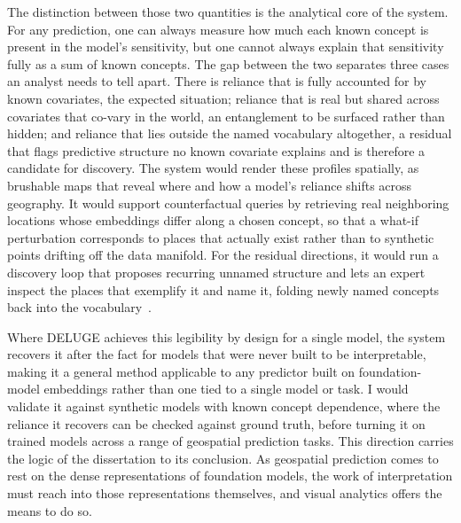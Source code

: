 The distinction between those two quantities is the analytical core of the system.
%
For any prediction, one can always measure how much each known concept is present in the model's sensitivity, but one cannot always explain that sensitivity fully as a sum of known concepts.
%
The gap between the two separates three cases an analyst needs to tell apart. There is reliance that is fully accounted for by known covariates, the expected situation; reliance that is real but shared across covariates that co-vary in the world, an entanglement to be surfaced rather than hidden; and reliance that lies outside the named vocabulary altogether, a residual that flags predictive structure no known covariate explains and is therefore a candidate for discovery.
%
The system would render these profiles spatially, as brushable maps that reveal where and how a model's reliance shifts across geography.
%
It would support counterfactual queries by retrieving real neighboring locations whose embeddings differ along a chosen concept, so that a what-if perturbation corresponds to places that actually exist rather than to synthetic points drifting off the data manifold.
%
For the residual directions, it would run a discovery loop that proposes recurring unnamed structure and lets an expert inspect the places that exemplify it and name it, folding newly named concepts back into the vocabulary~\cite{ghorbani2019ace}.

Where DELUGE achieves this legibility by design for a single model, the system recovers it after the fact for models that were never built to be interpretable, making it a general method applicable to any predictor built on foundation-model embeddings rather than one tied to a single model or task.
%
I would validate it against synthetic models with known concept dependence, where the reliance it recovers can be checked against ground truth, before turning it on trained models across a range of geospatial prediction tasks.
%
This direction carries the logic of the dissertation to its conclusion. As geospatial prediction comes to rest on the dense representations of foundation models, the work of interpretation must reach into those representations themselves, and visual analytics offers the means to do so.

